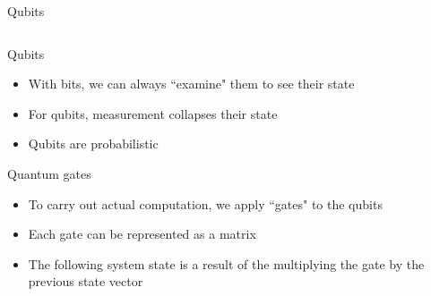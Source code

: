 \documentclass[14pt]{beamer}
\begin{document}
\begin{frame}{Qubits}
\begin{columns}[T]
\begin{column}{.4\textwidth}
\begin{block}{}
		\end{block}
	\end{column}
\end{columns}
\end{frame}

\begin{frame}{Qubits}
\begin{itemize}
	\item With bits, we can always ``examine" them to see their state
	\item For qubits, measurement collapses their state
	\item Qubits are probabilistic 
\end{itemize}
\end{frame}

\begin{frame}{Quantum gates}
\begin{itemize}
	\item To carry out actual computation, we apply ``gates" to the qubits
	\item Each gate can be represented as a matrix
	\item The following system state is a result of the multiplying the gate by the previous state vector
\end{itemize}
\end{frame}
\end{document}
